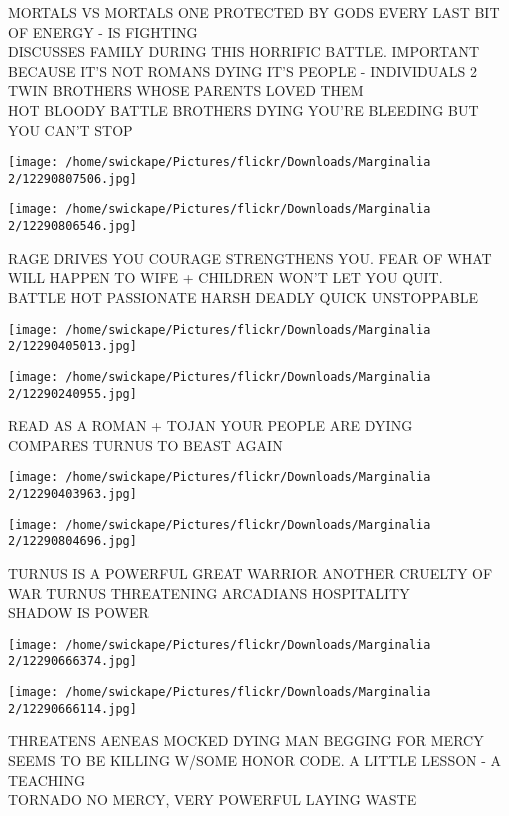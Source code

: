 \documentclass[10pt,letterpaper]{article}
\begin{document}
MORTALS VS MORTALS ONE PROTECTED BY GODS EVERY LAST BIT OF ENERGY {-} IS FIGHTING\\
DISCUSSES FAMILY DURING THIS HORRIFIC BATTLE.  IMPORTANT BECAUSE IT'S NOT ROMANS DYING IT'S PEOPLE {-} INDIVIDUALS 2 TWIN BROTHERS WHOSE PARENTS LOVED THEM\\
HOT BLOODY BATTLE BROTHERS DYING YOU'RE BLEEDING BUT YOU CAN'T STOP
\pagebreak

\texttt{[image: /home/swickape/Pictures/flickr/Downloads/Marginalia 2/12290807506.jpg]}

\vspace{0.25in}
\texttt{[image: /home/swickape/Pictures/flickr/Downloads/Marginalia 2/12290806546.jpg]}

RAGE DRIVES YOU COURAGE STRENGTHENS YOU. FEAR OF WHAT WILL HAPPEN TO WIFE + CHILDREN WON'T LET YOU QUIT.\\
BATTLE HOT PASSIONATE HARSH DEADLY QUICK UNSTOPPABLE
\pagebreak

\texttt{[image: /home/swickape/Pictures/flickr/Downloads/Marginalia 2/12290405013.jpg]}

\vspace{0.25in}
\texttt{[image: /home/swickape/Pictures/flickr/Downloads/Marginalia 2/12290240955.jpg]}

READ AS A ROMAN + TOJAN YOUR PEOPLE ARE DYING\\
COMPARES TURNUS TO BEAST AGAIN
\pagebreak

\texttt{[image: /home/swickape/Pictures/flickr/Downloads/Marginalia 2/12290403963.jpg]}

\vspace{0.25in}
\texttt{[image: /home/swickape/Pictures/flickr/Downloads/Marginalia 2/12290804696.jpg]}

TURNUS IS A POWERFUL GREAT WARRIOR ANOTHER CRUELTY OF WAR TURNUS THREATENING ARCADIANS HOSPITALITY\\
SHADOW IS POWER
\pagebreak

\texttt{[image: /home/swickape/Pictures/flickr/Downloads/Marginalia 2/12290666374.jpg]}

\vspace{0.25in}
\texttt{[image: /home/swickape/Pictures/flickr/Downloads/Marginalia 2/12290666114.jpg]}

THREATENS AENEAS MOCKED DYING MAN BEGGING FOR MERCY SEEMS TO BE KILLING W/SOME HONOR CODE. A LITTLE LESSON {-} A TEACHING\\
TORNADO NO MERCY, VERY POWERFUL LAYING WASTE
\pagebreak
\end{document}
